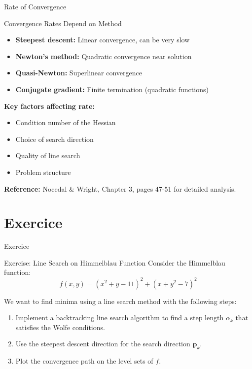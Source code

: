 \documentclass[aspectratio=1610]{beamer}
\begin{document}
\begin{frame}{Rate of Convergence}
  \begin{block}{Convergence Rates Depend on Method}
    \begin{itemize}
      \item \textbf{Steepest descent:} Linear convergence, can be very slow
      \item \textbf{Newton's method:} Quadratic convergence near solution
      \item \textbf{Quasi-Newton:} Superlinear convergence
      \item \textbf{Conjugate gradient:} Finite termination (quadratic functions)
    \end{itemize}
  \end{block}
  
  \vspace{0.3cm}
  
  \textbf{Key factors affecting rate:}
  \begin{itemize}
    \item Condition number of the Hessian
    \item Choice of search direction
    \item Quality of line search
    \item Problem structure
  \end{itemize}
  
  \vspace{0.3cm}
  
  \textbf{Reference:} Nocedal \& Wright, Chapter 3, pages 47-51 for detailed analysis.
\end{frame}


\section{Exercice}

\begin{frame}{Exercice}
  \begin{block}{Exercise: Line Search on Himmelblau Function}
    Consider the Himmelblau function:
    $$f(x,y) = (x^2 + y - 11)^2 + (x + y^2 - 7)^2$$

    We want to find minima using a line search method with the following steps:
    
    \begin{enumerate}
      \item Implement a backtracking line search algorithm to find a step length $\alpha_k$ that satisfies the Wolfe conditions.
      \item Use the steepest descent direction for the search direction $\mathbf{p}_k$.
      \item Plot the convergence path on the level sets of $f$.
    \end{enumerate}
  \end{block}
\end{frame}
\end{document}
